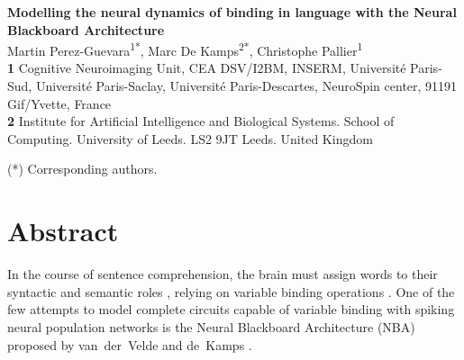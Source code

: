 \documentclass[10pt]{article}
\date{}
\begin{document}
\vspace*{0.2in}

\begin{flushleft} {\LARGE \textbf{Modelling the neural dynamics of
      binding in language with the Neural Blackboard Architecture} }
  \newline
  \\

  Martin Perez-Guevara\textsuperscript{1*}, Marc De Kamps\textsuperscript{2*}, Christophe Pallier\textsuperscript{1}
  \\
  \bigskip \textbf{1} Cognitive Neuroimaging Unit, CEA DSV/I2BM,
  INSERM, Université Paris-Sud, Université Paris-Saclay,
  Université Paris-Descartes, NeuroSpin center, 91191 Gif/Yvette, France
  \\
  \textbf{2} Institute for Artificial Intelligence and Biological
  Systems. School of Computing. University of Leeds. LS2 9JT Leeds.
  United Kingdom
  \\
  \bigskip


(*) Corresponding authors.
  
\end{flushleft}


\section*{Abstract}

In the course of sentence comprehension, the brain must assign words to their syntactic and semantic roles \cite{smolensky2006harmonic,Jackendoff_2002b}, relying on variable binding operations \cite{marcus14}.
One of the few attempts to model complete circuits capable of variable binding with spiking neural population networks is the Neural Blackboard Architecture (NBA) proposed by van~der~Velde and de~Kamps \cite{van_der_Velde_2006}.
\end{document}
